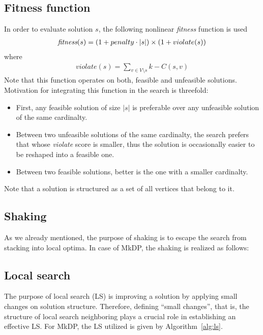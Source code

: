 \documentclass[sigconf]{acmart}
\begin{document}
   \subsection{Fitness function}
       In order to evaluate solution $s$, the following nonlinear \emph{fitness} function is used 
       \begin{align}\label{eq:fitness}
          \emph{fitness}(s) = ( 1+ penalty \cdot |s|) \times ( 1 + violate(s))
       \end{align}
       where 
       \begin{align}
       	   violate(s) = \sum_{v \in V \setminus s}   k - C(s, v)  
       \end{align}
   Note that this function operates on both, feasible and unfeasible solutions. 
       Motivation for integrating this function  in the search is threefold:
       \begin{itemize}
       	\item First, any feasible solution of size $|s|$ is preferable over any unfeasible solution of the same cardinalty. 
       	\item Between two unfeasible solutions of the same cardinalty, the search prefers that whose \emph{violate} score is smaller, thus the solution is occasionally easier to be reshaped into a feasible one.  
       	\item Between two feasible solutions, better is the one with a smaller cardinalty. 
       \end{itemize}
     Note that a solution is structured as a set of all vertices that belong to it. 
   
   \subsection{Shaking}
    As we already mentioned, the purpose of shaking is to escape the search from stacking into   local optima. In case of MkDP, the shaking is realized as follows:  
   \subsection{Local search}
  The purpose of local search (LS) is improving a solution by applying small changes on solution structure. Therefore, defining  ``small changes'', that is, the structure of local search neighboring plays a crucial role in establishing an effective LS.  For MkDP, the LS utilized is given by Algorithm~\ref{alg:ls}.
  
\end{document}
